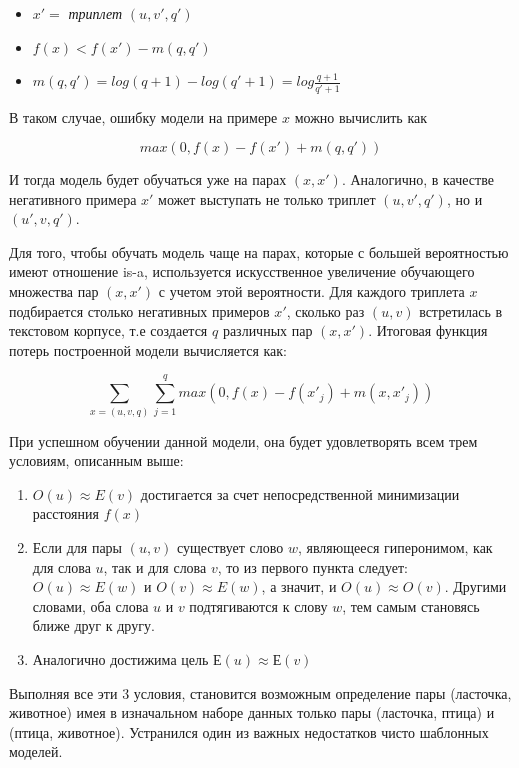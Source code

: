 \begin{itemize}
\item $x' =$ \textit{триплет} $(u, v', q')$

\item $f(x) < f(x') - m(q, q')$

\item $m(q, q') = log(q + 1) - log(q' + 1) = log \frac{q + 1}{q' + 1}$
\end{itemize}


В таком случае, ошибку модели на примере $x$ можно вычислить как

$$max(0, f(x) - f(x') + m(q, q') )$$

И тогда модель будет обучаться уже на парах $(x, x')$.
Аналогично, в качестве негативного примера $x'$ может выступать не только триплет
$(u, v', q')$, но и $(u', v, q')$.

Для того, чтобы обучать модель чаще на парах, которые с большей вероятностью
имеют отношение is-a, используется искусственное увеличение обучающего
множества пар $(x, x')$ с учетом этой вероятности. Для каждого триплета $x$
подбирается столько негативных примеров $x'$, сколько раз $(u, v)$ встретилась в
текстовом корпусе, т.е создается $q$ различных пар $(x, x')$.
Итоговая функция потерь построенной модели вычисляется как:

$$\sum_{x = (u, v, q)} \sum_{j = 1}^{q} max(0, f(x) - f(x'_j) + m(x, x'_j))$$

При успешном обучении данной модели, она будет удовлетворять всем трем
условиям, описанным выше:

\begin{enumerate}
\item $O(u) \approx E(v)$ достигается за счет непосредственной минимизации расстояния $f(x)$
\item Если для пары $(u, v)$ существует слово $w$, являющееся гиперонимом, как для
слова $u$, так и для слова $v$, то из первого пункта следует: $O(u) \approx E(w)$ и $O(v) \approx E(w)$, а значит, и $O(u) \approx O(v)$. Другими словами, оба слова $u$ и $v$ подтягиваются к
слову $w$, тем самым становясь ближе друг к другу.
\item Аналогично достижима цель $Е(u) \approx Е(v)$
\end{enumerate}

Выполняя все эти 3 условия, становится возможным определение пары (ласточка,
животное) имея в изначальном наборе данных только пары (ласточка, птица) и
(птица, животное). Устранился один из важных недостатков чисто шаблонных
моделей.

